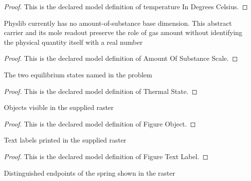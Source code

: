 \begin{proof}
  This is the declared model definition of temperature In Degrees Celsius.
\end{proof}
\begin{definition}
  \label{def:physics:phyx-mini-0375:phyxminiproblems-problemphyxmini0375-amountofsubstancescale}
  Physlib currently has no amount-of-substance base dimension. This abstract carrier and its mole readout preserve the role of gas amount without identifying the physical quantity itself with a real number
\end{definition}
\begin{proof}
  This is the declared model definition of Amount Of Substance Scale.
\end{proof}
\begin{definition}
  \label{def:physics:phyx-mini-0375:phyxminiproblems-problemphyxmini0375-thermalstate}
  The two equilibrium states named in the problem
\end{definition}
\begin{proof}
  This is the declared model definition of Thermal State.
\end{proof}
\begin{definition}
  \label{def:physics:phyx-mini-0375:phyxminiproblems-problemphyxmini0375-figureobject}
  Objects visible in the supplied raster
\end{definition}
\begin{proof}
  This is the declared model definition of Figure Object.
\end{proof}
\begin{definition}
  \label{def:physics:phyx-mini-0375:phyxminiproblems-problemphyxmini0375-figuretextlabel}
  Text labels printed in the supplied raster
\end{definition}
\begin{proof}
  This is the declared model definition of Figure Text Label.
\end{proof}
\begin{definition}
  \label{def:physics:phyx-mini-0375:phyxminiproblems-problemphyxmini0375-springendpoint}
  Distinguished endpoints of the spring shown in the raster
\end{definition}
